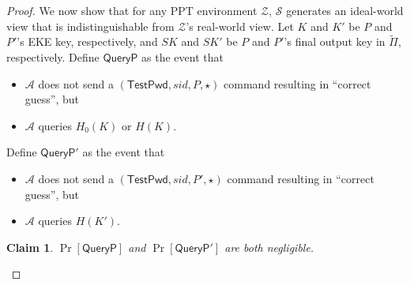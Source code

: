 \documentclass{article}
\newtheorem{claim}{Claim}
\newcommand{\adv}{\mathcal{A}}
\newcommand{\env}{\mathcal{Z}}
\renewcommand{\sim}{\mathcal{S}}
\newcommand{\TestPwd}{\mathsf{TestPwd}}
\begin{document}
\begin{proof}
We now show that for any PPT environment $\env$, $\sim$ generates an ideal-world view that is indistinguishable from $\env$'s real-world view. Let $K$ and $K'$ be $P$ and $P'$'s EKE key, respectively, and $SK$ and $SK'$ be $P$ and $P'$'s final output key in $\tilde{\Pi}$, respectively. Define $\mathsf{QueryP}$ as the event that
\begin{itemize}
  \item $\adv$ does not send a $(\TestPwd, sid, P, \star)$ command resulting in ``correct guess'', but
  \item $\adv$ queries $H_0(K)$ or $H(K)$.
\end{itemize}
Define $\mathsf{QueryP'}$ as the event that
\begin{itemize}
  \item $\adv$ does not send a $(\TestPwd, sid, P', \star)$ command resulting in ``correct guess'', but
  \item $\adv$ queries $H(K')$.
\end{itemize}
\begin{claim}
$\Pr[\mathsf{QueryP}]$ and $\Pr[\mathsf{QueryP'}]$ are both negligible.
\end{claim}


\end{proof}
\end{document}
